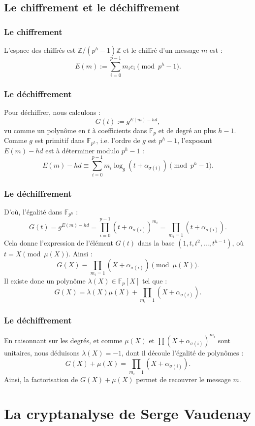 \documentclass{beamer}
\theoremstyle{definition}
\theoremstyle{remark}
\def\Z{\mathbb Z}
\def\gf #1{\mathbb{F}_{#1}}
\begin{document}
\subsection{Le chiffrement et le déchiffrement}
\begin{frame}
  \frametitle{Le chiffrement}
  L'espace des chiffrés est $\Z/(p^h-1)\Z$ et le chiffré d'un message $m$ est :
$$E(m) := \sum_{i=0}^{p-1} m_ic_i \pmod{p^h-1}.$$
\end{frame}

\begin{frame}
  \frametitle{Le déchiffrement}
  Pour déchiffrer, nous calculons :
$$G(t) := g^{E(m) - hd},$$
vu comme un polynôme en $t$ à coefficients dans $\gf{p}$ et de degré au plus $h-1$. Comme $g$ est primitif dans $\gf{p^h}$, i.e. l'ordre de $g$ est $p^h-1$, l'exposant $E(m) - hd$ est à déterminer modulo $p^h-1$ :
$$E(m) - hd \equiv  \sum_{i=0}^{p-1} m_i\log_g\left(t + \alpha_{\sigma(i)}\right) \pmod{p^h-1}.$$
\end{frame}
\begin{frame}
  \frametitle{Le déchiffrement}
D'où, l'égalité dans $\gf{p^h}$ :
$$G(t) = g^{E(m) - hd} = \prod_{i=0}^{p-1} \left(t+\alpha_{\sigma(i)}\right)^{m_i} = \prod_{m_i = 1} \left(t+\alpha_{\sigma(i)}\right).$$
Cela donne l'expression de l'élément $G(t)$ dans la base $(1,t,t^2, \dots, t^{h-1})$, où $t = X \pmod{\mu(X)}$. Ainsi :
$$G(X) \equiv \prod_{m_i = 1} \left(X+\alpha_{\sigma(i)}\right) \pmod{\mu(X)}.$$
Il existe donc un polynôme $\lambda(X) \in \gf{p}[X]$ tel que : $$G(X) = \lambda(X) \mu(X) + \prod_{m_i = 1} \left(X+\alpha_{\sigma(i)}\right).$$
\end{frame}
\begin{frame}
  \frametitle{Le déchiffrement}
En raisonnant sur les degrés, et comme $\mu(X)$ et $\prod \left(X+\alpha_{\sigma(i)}\right)^{m_i}$ sont unitaires, nous déduisons  $\lambda(X) = -1$, dont il découle l'égalité de polynômes :
$$G(X) + \mu(X) = \prod_{m_i = 1} \left(X+\alpha_{\sigma(i)}\right).$$
Ainsi, la factorisation de $G(X)+\mu(X)$ permet de recouvrer le message $m$.
\end{frame}

\section{La cryptanalyse de Serge Vaudenay}
\end{document}
